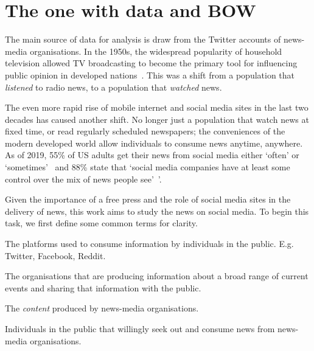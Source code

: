 \chapter{The one with data and BOW\label{ch:dataandBOW}}

The main source of data for analysis is draw from the Twitter accounts of news-media organisations. In the 1950s, the widespread popularity of household television allowed TV broadcasting to become the primary tool for influencing public opinion in developed nations~\cite{diggs-brown_strategic_2011}.  This was a shift from a population that \emph{listened} to radio news, to a population that \emph{watched} news. 

The even more rapid rise of mobile internet and social media sites in the last two decades has caused another shift. No longer just a population that watch news at fixed time, or read regularly scheduled newspapers; the conveniences of the modern developed world allow individuals to consume news anytime, anywhere. As of 2019, 55\% of US adults get their news from social media either `often' or `sometimes'~ and 88\% state that `social media companies have at least some control over the mix of news people see'~'\cite{shearer_americans_2019}.

Given the importance of a free press and the role of social media sites in the delivery of news, this work aims to study the news on social media. To begin this task, we first define some common terms for clarity.

\begin{definition}
	The platforms used to consume information by individuals in the public. E.g. Twitter, Facebook, Reddit.
\end{definition}

\begin{definition}
	The organisations that are producing information about a broad range of current events and sharing that information with the public.
\end{definition}

\begin{definition}[News]
	The \emph{content} produced by news-media organisations. 
\end{definition}


\begin{definition}[Consumers]
	Individuals in the public that willingly seek out and consume news from news-media organisations.
\end{definition}

